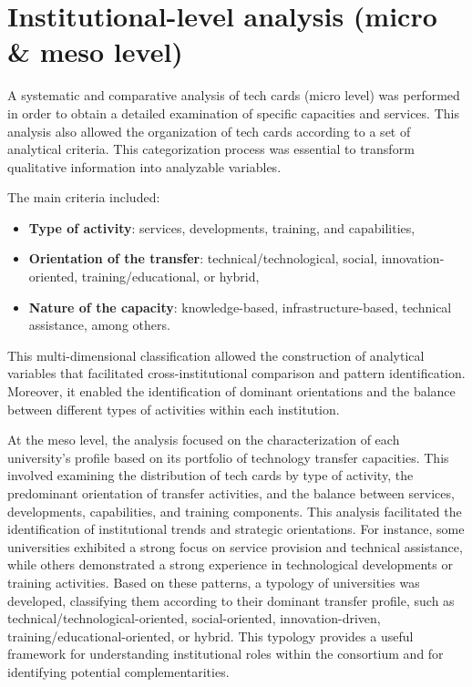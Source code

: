 \documentclass[
  12pt,
  oneside]{book}
\providecommand{\tightlist}{%
  \setlength{\itemsep}{0pt}\setlength{\parskip}{0pt}}
\begin{document}
\section{Institutional-level analysis (micro \& meso
level)}\label{institutional-level-analysis-micro-meso-level}

A systematic and comparative analysis of tech cards (micro level) was
performed in order to obtain a detailed examination of specific
capacities and services. This analysis also allowed the organization of
tech cards according to a set of analytical criteria. This
categorization process was essential to transform qualitative
information into analyzable variables.

The main criteria included:

\begin{itemize}
\tightlist
\item
  \textbf{Type of activity}: services, developments, training, and
  capabilities,
\item
  \textbf{Orientation of the transfer}: technical/technological, social,
  innovation-oriented, training/educational, or hybrid,
\item
  \textbf{Nature of the capacity}: knowledge-based,
  infrastructure-based, technical assistance, among others.
\end{itemize}

This multi-dimensional classification allowed the construction of
analytical variables that facilitated cross-institutional comparison and
pattern identification. Moreover, it enabled the identification of
dominant orientations and the balance between different types of
activities within each institution.

At the meso level, the analysis focused on the characterization of each
university's profile based on its portfolio of technology transfer
capacities. This involved examining the distribution of tech cards by
type of activity, the predominant orientation of transfer activities,
and the balance between services, developments, capabilities, and
training components. This analysis facilitated the identification of
institutional trends and strategic orientations. For instance, some
universities exhibited a strong focus on service provision and technical
assistance, while others demonstrated a strong experience in
technological developments or training activities. Based on these
patterns, a typology of universities was developed, classifying them
according to their dominant transfer profile, such as
technical/technological-oriented, social-oriented, innovation-driven,
training/educational-oriented, or hybrid. This typology provides a
useful framework for understanding institutional roles within the
consortium and for identifying potential complementarities.
\end{document}

